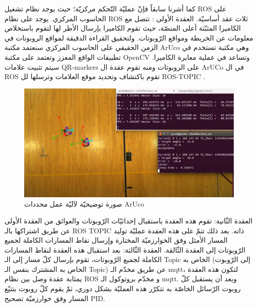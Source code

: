 كما أشرنا سابقاً فإنّ عمليّة التّحكم مركزيّة؛ حيث يوجد نظام تشغيل ROS على الحاسوب المركزي. يوجد على نظام ROS ثلاث عقد أساسيّة.
العقدة الأولى : تتصل مع الكاميرا المثبّتة أعلى المنصّة، حيث تقوم الكاميرا بإرسال الأطر لها لتقوم باستخلاص معلومات عن الخريطة ومواقع الرّوبوتات. ولتحقيق القراءة الدقيقة لمواقع الروبوتات في الزمن الحقيقي على الحاسوب المركزي سنعتمد مكتبة ArUco وهي مكتبة تستخدم في تطبيقات الواقع المعزز وتعتمد على مكتبة OpenCV  وتساعد في عملية معايرة الكاميرا. سيتم تثبيت علامات QR-markers على الروبوتات ومنه تقوم عقدة ال ArUCo في ال ROS تقوم باكتشاف وتحديد موقع العلامات وترسلها لل ROS-TOPIC .



\begin{figure}
	\centering
	\includegraphics[width=0.7\linewidth]{figs/20/fig20_1}
	\caption{صورة توضيحيّة لآليّة عمل محددات ArUco}
	\label{20:fig:1}
\end{figure}

العقدة الثّانية: تقوم هذه العقدة باستقبال إحداثيّات الرّوبوتات والعوائق من العقدة الأولى عن طريق اشتراكها بالـ ROS TOPIC ذاته. بعد ذلك تتمّ على هذه العقدة عمليّة توليد المسار الأمثل وفق الخوارزميّة المختارة وإرسال نقاط المسارات الكاملة لجميع الرّوبوتات إلى العقدة الثّالقة.
العقدة الثّالثة: بعد استقبال هذه العقدة لنقاط المسارات الكاملة لجميع الرّوبوتات، تقوم بإرسال كلّ مسار إلى الـ Topic الخاص به  (إلى الرّوبوت الخاص به المشترك بنفس الـ Topic) عن طريق مخدّم الـ mqtt، لتكون هذه العقدة يمثابة عقدة وصل بين نظام ROS و مخدّم بروتوكول الـ mqtt.
وبعد أن يستقبل كلّ روبوت الرّسائل الخاصّة به تتكرّر هذه العمليّة بشكل دوري، ثمّ يقوم كلّ روبوت بتتيّع المسار وفق خوارزميّة تصحيح PID.

